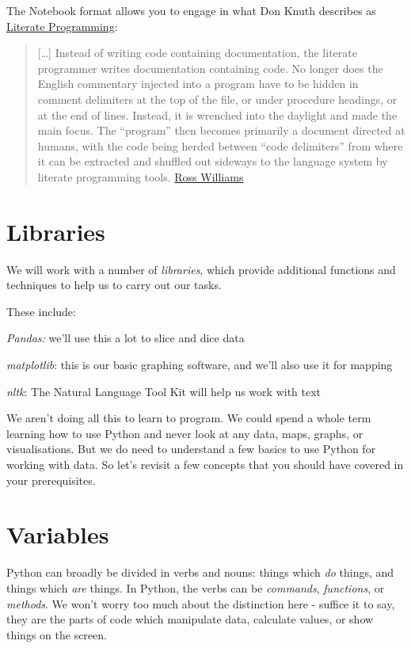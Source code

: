 \documentclass[
  letterpaper,
  DIV=11,
  numbers=noendperiod]{scrreprt}
\begin{document}
The Notebook format allows you to engage in what Don Knuth describes as
\href{http://en.wikipedia.org/wiki/Literate_programming}{Literate
Programming}:

\begin{quote}
{[}\ldots{]} Instead of writing code containing documentation, the
literate programmer writes documentation containing code. No longer does
the English commentary injected into a program have to be hidden in
comment delimiters at the top of the file, or under procedure headings,
or at the end of lines. Instead, it is wrenched into the daylight and
made the main focus. The ``program'' then becomes primarily a document
directed at humans, with the code being herded between ``code
delimiters'' from where it can be extracted and shuffled out sideways to
the language system by literate programming tools.
\href{http://www.literateprogramming.com/lpquotes.html}{Ross Williams}
\end{quote}

\hypertarget{libraries}{%
\section{Libraries}\label{libraries}}

We will work with a number of \emph{libraries}, which provide additional
functions and techniques to help us to carry out our tasks.

These include:

\emph{Pandas:} we'll use this a lot to slice and dice data

\emph{matplotlib}: this is our basic graphing software, and we'll also
use it for mapping

\emph{nltk}: The Natural Language Tool Kit will help us work with text

We aren't doing all this to learn to program. We could spend a whole
term learning how to use Python and never look at any data, maps,
graphs, or visualisations. But we do need to understand a few basics to
use Python for working with data. So let's revisit a few concepts that
you should have covered in your prerequisites.

\hypertarget{variables}{%
\section{Variables}\label{variables}}

Python can broadly be divided in verbs and nouns: things which \emph{do}
things, and things which \emph{are} things. In Python, the verbs can be
\emph{commands}, \emph{functions}, or \emph{methods}. We won't worry too
much about the distinction here - suffice it to say, they are the parts
of code which manipulate data, calculate values, or show things on the
screen.
\end{document}
